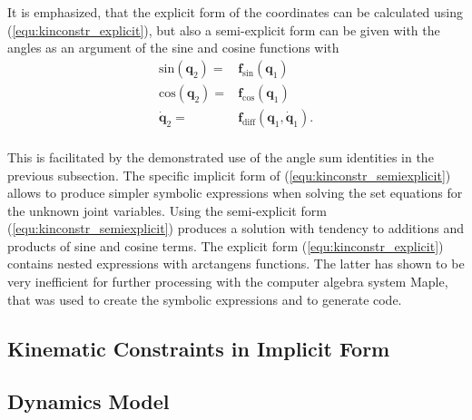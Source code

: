 \documentclass[letterpaper, 10 pt, conference]{ieeeconf}  %
\begin{document}
It is emphasized, that the explicit form of the coordinates can be calculated using (\ref{equ:kinconstr_explicit}), but also a semi-explicit form can be given with the angles as an argument of the sine and cosine functions with
%
\begin{align}
\mathrm{sin}(\bm{q}_2) =& \bm{f}_\mathrm{sin}(\bm{q}_1) \nonumber \\
\mathrm{cos}(\bm{q}_2) =& \bm{f}_\mathrm{cos}(\bm{q}_1) \nonumber \\
\dot{\bm{q}}_2 =& \bm{f}_\mathrm{diff}(\bm{q}_1,\dot{\bm{q}}_1). \nonumber \\
\label{equ:kinconstr_semiexplicit}
\end{align}
%

This is facilitated by the demonstrated use of the angle sum identities in the previous subsection.
The specific implicit form of (\ref{equ:kinconstr_semiexplicit}) allows to produce simpler symbolic expressions when solving the set equations for the unknown joint variables.
Using the semi-explicit form (\ref{equ:kinconstr_semiexplicit}) produces a solution with tendency to additions and products of sine and cosine terms.
The explicit form (\ref{equ:kinconstr_explicit}) contains nested expressions with arctangens functions.
The latter has shown to be very inefficient for further processing with the computer algebra system Maple, that was used to create the symbolic expressions and to generate code.

%

\subsection{Kinematic Constraints in Implicit Form}



\subsection{Dynamics Model}
\end{document}

